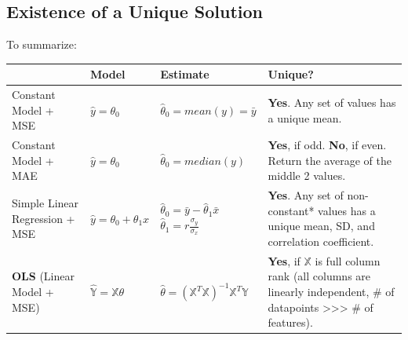 \documentclass[
  letterpaper,
  DIV=11,
  numbers=noendperiod]{scrreprt}
\begin{document}
\subsection{Existence of a Unique
Solution}\label{existence-of-a-unique-solution}

To summarize:

\begin{longtable}[]{@{}
  >{\raggedright\arraybackslash}p{}
  >{\raggedright\arraybackslash}p{}
  >{\raggedright\arraybackslash}p{}
  >{\raggedright\arraybackslash}p{}@{}}
\toprule\noalign{}
\begin{minipage}[b]{\linewidth}\raggedright
\end{minipage} & \begin{minipage}[b]{\linewidth}\raggedright
Model
\end{minipage} & \begin{minipage}[b]{\linewidth}\raggedright
Estimate
\end{minipage} & \begin{minipage}[b]{\linewidth}\raggedright
Unique?
\end{minipage} \\
\midrule\noalign{}
\endhead
\bottomrule\noalign{}
\endlastfoot
Constant Model + MSE & \(\hat{y} = \theta_0\) &
\(\hat{\theta}_0 = mean(y) = \bar{y}\) & \textbf{Yes}. Any set of values
has a unique mean. \\
Constant Model + MAE & \(\hat{y} = \theta_0\) &
\(\hat{\theta}_0 = median(y)\) & \textbf{Yes}, if odd. \textbf{No}, if
even. Return the average of the middle 2 values. \\
Simple Linear Regression + MSE & \(\hat{y} = \theta_0 + \theta_1x\) &
\(\hat{\theta}_0 = \bar{y} - \hat{\theta}_1\bar{x}\)
\(\hat{\theta}_1 = r\frac{\sigma_y}{\sigma_x}\) & \textbf{Yes}. Any set
of non-constant* values has a unique mean, SD, and correlation
coefficient. \\
\textbf{OLS} (Linear Model + MSE) &
\(\mathbb{\hat{Y}} = \mathbb{X}\mathbb{\theta}\) &
\(\hat{\theta} = (\mathbb{X}^T\mathbb{X})^{-1}\mathbb{X}^T\mathbb{Y}\) &
\textbf{Yes}, if \(\mathbb{X}\) is full column rank (all columns are
linearly independent, \# of datapoints
\textgreater\textgreater\textgreater{} \# of features). \\
\end{longtable}
\end{document}
